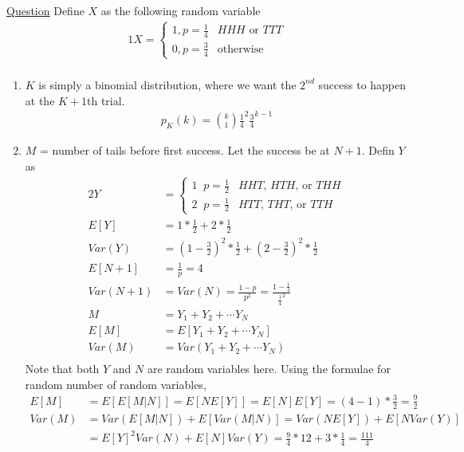 \documentclass[../probability-notes.tex]{subfiles}
\begin{document}
\begin{enumerate}
        \hypertarget{a_threecoins}{\item} \hyperlink{q_threecoins}{Question}\newline
        Define $X$ as the following random variable
        \begin{alignat*}{1}
            X = \begin{cases} 1, p = \frac{1}{4} &\mbox{$HHH$ or $TTT$}\\
                             0, p = \frac{3}{4} &\mbox{otherwise} \end{cases}\\
        \end{alignat*}

        \begin{enumerate}
            \item $K$ is simply a binomial distribution, where we want the $2^{nd}$ success to happen at the $K+1$th trial.
            \begin{align*}
                p_{K}(k) = \binom{k}{1}\frac{1}{4}^{2}\frac{3}{4}^{k-1} \tag*{since the last trial is success}
            \end{align*}

            \item $M$ = number of tails before first success. Let the success be at $N+1$. Defin $Y$ as
            \begin{alignat*}{2}
                Y &= \begin{cases} 1\;\; p=\frac{1}{2} &\mbox{$HHT$, $HTH$, or $THH$}\\
                                 2\;\; p=\frac{1}{2} &\mbox{$HTT$, $THT$, or $TTH$} \end{cases}\\
                E[Y] &= 1 * \frac{1}{2} + 2 * \frac{1}{2}\\
                Var(Y) &= (1 - \frac{3}{2})^{2} * \frac{1}{2} + (2 - \frac{3}{2})^{2} * \frac{1}{2}\\
                E[N+1] &= \frac{1}{p} = 4\\
                Var(N+1) &= Var(N) = \frac{1-p}{p^{2}} = \frac{1 - \frac{1}{4}}{\frac{1}{4}^{2}}\\
                M &= Y_{1} + Y_{2} + \cdots Y_{N}\\
                E[M] &= E[Y_{1} + Y_{2} + \cdots Y_{N}]\\
                Var(M) &= Var(Y_{1} + Y_{2} + \cdots Y_{N})\\
            \end{alignat*}
            Note that both $Y$ and $N$ are random variables here. Using the formulae for random number of random variables,
            \begin{align*}
                E[M] &= E[E[M|N]] = E[NE[Y]] = E[N]E[Y] = (4-1) * \frac{3}{2} = \frac{9}{2}\\
                Var(M) &= Var(E[M|N]) + E[Var(M|N)] = Var(NE[Y]) + E[NVar(Y)]\\ 
                    &= E[Y]^{2}Var(N) + E[N]Var(Y) = \frac{9}{4} * 12 + 3 * \frac{1}{4} = \frac{111}{4}
            \end{align*}


\end{enumerate}
\end{enumerate}
\end{document}
